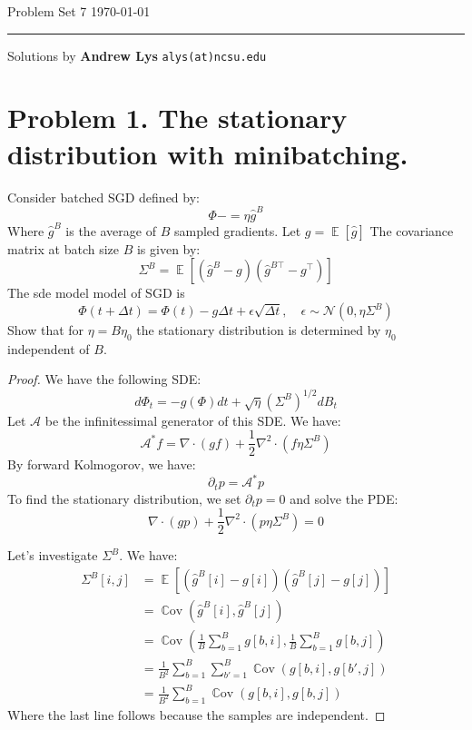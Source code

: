 \documentclass{amsart}
\newcommand{\cA}{\mathcal{A}}
\newcommand{\cN}{\mathcal{N}}
\newcommand{\Cov}[1]{\operatorname{\mathbb{C}ov}\left(#1\right)}
\newcommand{\ee}[1]{\operatorname{\mathbb{E}}\left[#1\right]}
\theoremstyle{definition}
\begin{document}
\noindent
Problem Set 7  \hfill \today  %
\smallskip
\hrule
\smallskip
\noindent
Solutions by {\bf Andrew Lys} \qquad   %
  {\tt alys(at)ncsu.edu}

\vspace{0.5cm}

\section*{Problem 1. The stationary distribution with minibatching.}
Consider batched SGD defined by:
\[
\Phi -= \eta \hat{g}^B
\]
Where $\hat{g}^B$ is the average of $B$ sampled gradients. 
Let $g = \ee{\hat{g}}$
The covariance matrix at batch size $B$ is given by:
\[
\Sigma^B = \ee{(\hat{g}^B - g)(\hat{g}^{B\top} - g^\top)}
\]
The sde model model of SGD is 
\[
\Phi(t + \Delta t) = \Phi(t) - g\Delta t + \epsilon \sqrt{\Delta t}, \quad \epsilon \sim \cN(0, \eta \Sigma^B)
\]
Show that for $\eta = B \eta_0$ the stationary distribution is determined by $\eta_0$ independent of $B$. 
\begin{proof}
We have the following SDE:
\[
d \Phi_t = - g(\Phi) d t + \sqrt{\eta} (\Sigma^B)^{1/2} d B_t
\]
Let $\cA$ be the infinitessimal generator of this SDE. 
We have:
\[
\cA^\ast f =  \nabla \cdot (g f) + \frac12 \nabla^2 \cdot (f \eta\Sigma^B)
\]
By forward Kolmogorov, we have:
\[
\partial_t p = \cA^\ast p 
\]
To find the stationary distribution, we set $\partial_t p = 0$ and solve the PDE:
\[
\nabla \cdot (g p) + \frac12 \nabla^2 \cdot (p \eta\Sigma^B) = 0
\]

Let's investigate $\Sigma^B$. We have:
\begin{align*}
  \Sigma^B[i,j] &= \ee{(\hat{g}^B[i] - g[i])(\hat{g}^B[j] - g[j])} \\
  &= \Cov{\hat{g}^B[i], \hat{g}^B[j]} \\
  &= \Cov{\frac{1}{B} \sum_{b = 1}^B g[b, i], \frac{1}{B} \sum_{b = 1}^B g[b, j]} \\
  &= \frac{1}{B^2} \sum_{b = 1}^B \sum_{b' = 1}^B \Cov{g[b, i], g[b', j]} \\
  &= \frac{1}{B^2} \sum_{b = 1}^B \Cov{g[b, i], g[b, j]} 
\end{align*}
Where the last line follows because the samples are independent.

\end{proof}
\end{document}

